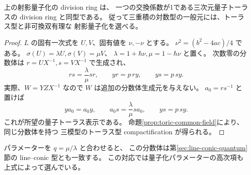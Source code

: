 \begin{theorem}\label{thm:cube-log-torus}
上の射影量子化の division ring は、
一つの交換係数が1である三次元量子トーラスの division ring と同型である。
従って三重積の対数型の一般元には、トーラス型と非可換双有理な
射影量子化を選べる。
\end{theorem}
\begin{proof}
$L$ の固有一次式を $U,V$、固有値を $\nu,-\nu$ とする。
$\nu^2=(b^2-4ac)/4$ である。
$\sigma(U)=\lambda U,\sigma(V)=\mu V$、
$\lambda=1+\hbar\nu,\mu=1-\hbar\nu$ と置く。
次数零の分数体は $r=UX^{-1},s=VX^{-1}$ で生成され、
\[
 rs=\frac\lambda\mu sr,
 \qquad yr=p\,ry,\qquad ys=p\,sy.
\]
実際、$W=YZ X^{-1}$ なので $W$ は追加の分数体生成元を与えない。
$a_0=rs^{-1}$ と置けば
\[
 ya_0=a_0y,\qquad
 a_0s=\frac\lambda\mu sa_0,\qquad ys=p\,sy.
\]
これが所望の量子トーラス表示である。
命題\ref{prop:toric-common-field}により、同じ分数体を持つ
三模型のトーラス型 compactification が得られる。
\end{proof}

パラメーターを $q=\mu/\lambda$ と合わせると、
この分数体は第\ref{sec:line-conic-quantum}節の line--conic 型とも一致する。
この対応では量子化パラメーターの高次項も上式によって選んでいる。

